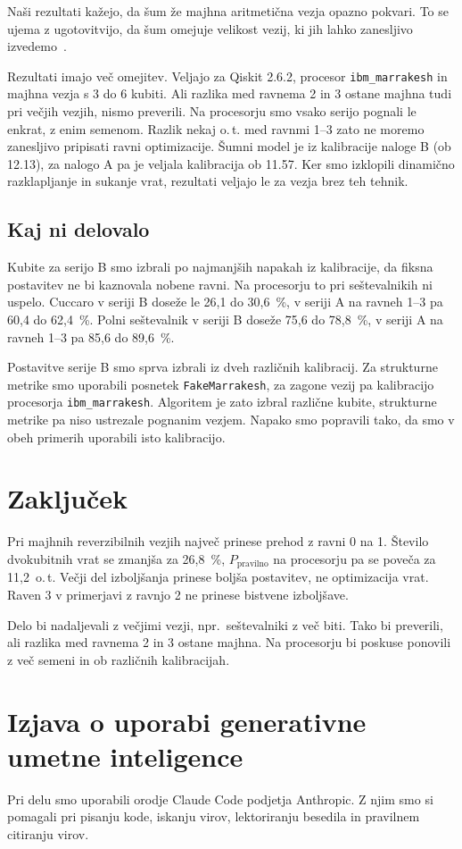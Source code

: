 \documentclass[graybox, envcountchap]{svmult}
\begin{document}
Naši rezultati kažejo,
da šum že majhna aritmetična vezja opazno pokvari.
To se ujema z ugotovitvijo, da šum omejuje velikost vezij,
ki jih lahko zanesljivo izvedemo~\cite{preskill2018}.

Rezultati imajo več omejitev.
Veljajo za Qiskit 2.6.2, procesor \texttt{ibm\_marrakesh}
in majhna vezja s 3 do 6 kubiti.
Ali razlika med ravnema 2 in 3
ostane majhna tudi pri večjih vezjih, nismo preverili.
Na procesorju smo vsako serijo pognali le enkrat,
z enim semenom.
Razlik nekaj o.\,t. med ravnmi 1--3
zato ne moremo zanesljivo pripisati ravni optimizacije.
Šumni model je iz kalibracije naloge B (ob 12.13),
za nalogo A pa je veljala kalibracija ob 11.57.
Ker smo izklopili dinamično razklapljanje in sukanje vrat,
rezultati veljajo le za vezja brez teh tehnik.

\subsection{Kaj ni delovalo}
\label{g10:sec:neuspehi}

Kubite za serijo B smo izbrali po najmanjših napakah
iz kalibracije, da fiksna postavitev
ne bi kaznovala nobene ravni.
Na procesorju to pri seštevalnikih ni uspelo.
Cuccaro v seriji B doseže le 26,1 do 30,6~\%,
v seriji A na ravneh 1--3 pa 60,4 do 62,4~\%.
Polni seštevalnik v seriji B doseže 75,6 do 78,8~\%,
v seriji A na ravneh 1--3 pa 85,6 do 89,6~\%.

Postavitve serije B smo sprva izbrali iz dveh različnih
kalibracij. Za strukturne metrike smo uporabili posnetek
\texttt{FakeMarrakesh}, za zagone vezij pa kalibracijo
procesorja \texttt{ibm\_marrakesh}. Algoritem je zato 
izbral različne kubite, strukturne metrike pa niso ustrezale 
pognanim vezjem.
Napako smo popravili tako, da smo v obeh primerih uporabili isto
kalibracijo.


\section{Zaključek}
\label{g10:sec:zakljucek}

Pri majhnih reverzibilnih vezjih
največ prinese prehod z ravni 0 na 1.
Število dvokubitnih vrat se zmanjša za 26,8~\%,
$P_\text{pravilno}$ na procesorju pa se poveča za 11,2~o.\,t.
Večji del izboljšanja prinese boljša postavitev,
ne optimizacija vrat.
Raven 3 v primerjavi z ravnjo 2
ne prinese bistvene izboljšave.

Delo bi nadaljevali z večjimi vezji,
npr.\ seštevalniki z več biti.
Tako bi preverili, ali razlika med ravnema 2 in 3
ostane majhna.
Na procesorju bi poskuse ponovili z več semeni
in ob različnih kalibracijah.


\section*{Izjava o uporabi generativne umetne inteligence}

Pri delu smo uporabili orodje Claude Code podjetja Anthropic.
Z njim smo si pomagali pri pisanju kode,
iskanju virov, lektoriranju besedila
in pravilnem citiranju virov.

  

\end{document}
